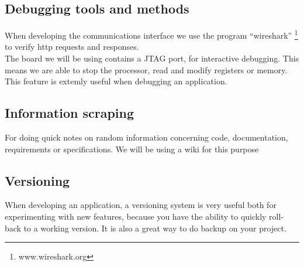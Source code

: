 \subsection{Debugging tools and methods}
When developing the communications interface we use the program ``wireshark'' \footnote{www.wireshark.org} to verify http requests and responses.\\
The board we will be using contains a JTAG port, for interactive debugging. This means we are able to stop the processor, read and modify registers or memory. This feature is extemly useful when debugging an application.

\subsection{Information scraping}
For doing quick notes on random information concerning code, documentation, requirements or specifications. We will be using a wiki for this purpose

\subsection{Versioning}
When developing an application, a versioning system is very useful both for experimenting with new features, because you have the ability to quickly roll-back to a working version. It is also a great way to do backup on your project.




